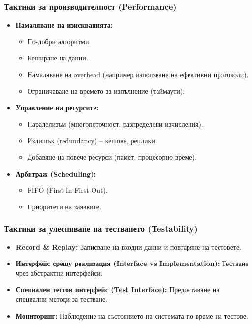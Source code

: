 \documentclass{scrartcl}
\begin{document}
\begin{FlushLeft}
\subsubsection{Тактики за производителност (Performance)}
\begin{itemize}
    \item \textbf{Намаляване на изискванията:}
    \begin{itemize}
        \item По-добри алгоритми.
        \item Кеширане на данни.
        \item Намаляване на overhead (например използване на ефективни протоколи).
        \item Ограничаване на времето за изпълнение (таймаути).
    \end{itemize}
    \item \textbf{Управление на ресурсите:}
    \begin{itemize}
        \item Паралелизъм (многопоточност, разпределени изчисления).
        \item Излишък (redundancy) – кешове, реплики.
        \item Добавяне на повече ресурси (памет, процесорно време).
    \end{itemize}
    \item \textbf{Арбитраж (Scheduling):}
    \begin{itemize}
        \item FIFO (First-In-First-Out).
        \item Приоритети на заявките.
    \end{itemize}
\end{itemize}

\subsubsection{Тактики за улесняване на тестването (Testability)}
\begin{itemize}
    \item \textbf{Record \& Replay:} Записване на входни данни и повтаряне на тестовете.
    \item \textbf{Интерфейс срещу реализация (Interface vs Implementation):} Тестване чрез абстрактни интерфейси.
    \item \textbf{Специален тестов интерфейс (Test Interface):} Предоставяне на специални методи за тестване.
    \item \textbf{Мониторинг:} Наблюдение на състоянието на системата по време на тестове.
\end{itemize}


\end{FlushLeft}
\end{document}
